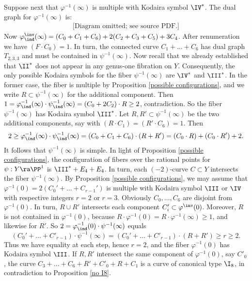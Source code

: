 Suppose next that $\varphi^{-1}(\infty)$ is multiple with Kodaira symbol $\IV^*$.
The dual graph for $\varphi^{-1}(\infty)$ is:
\begin{equation*}
\begin{gathered}
\text{[Diagram omitted; see source PDF.]}
\end{gathered}
\end{equation*}
Now $\varphi^\inv_\ind(\infty)=(C_0+C_1+C_6)+2(C_2+C_3+C_5)+ 3C_4$.
After renumeration  we have $(F\cdot C_0)=1$. In turn, the connected curve $C_1+\ldots+C_6$ has dual graph $T_{2,3,3}$
and must be contained in $\psi^{-1}(\infty)$.
Now recall that we already established that $\II^*$ does not appear in any genus-one fibration on $Y$.
Consequently, the only possible Kodaira symbols for
the fiber $\psi^{-1}(\infty)$ are $\IV^*$ and $\III^*$.
In the former case, the fiber is multiple  by Proposition \ref{possible configurations},
and we write  $R\subset\psi^{-1}(\infty)$ for the additional component.
Then $1=\varphi^{-1}_\ind(\infty)\cdot\psi^{-1}_\ind(\infty) = (C_0+2C_2)\cdot R\geq 2$, contradiction.
So the fiber $\psi^{-1}(\infty)$ has Kodaira symbol $\III^*$.
Let $R,R'\subset\psi^{-1}(\infty)$ be the two additional components, say with
$(R\cdot C_1)=(R'\cdot C_6)=1$. Then
$$
2\geq \varphi^{-1}_\ind(\infty)\cdot\psi^{-1}_\ind(\infty)  = (C_0+C_1+C_6)\cdot (R+R')= (C_0\cdot R) + (C_0\cdot R')+2.
$$
It follows that $\psi^{-1}(\infty)$ is simple. In light of Proposition \ref{possible configurations},
the configuration of fibers over the rational points  for $\psi:Y\ra\PP^1$
is $\III^*+E_4+E_4$. In turn, each $(-2)$-curve $C\subset Y$ intersects the fiber $\psi^{-1}(\infty)$.
By Proposition \ref{possible configurations},
we may assume that $\varphi^{-1}(0)=2(C_0'+\ldots+C_{r-1}')$ is multiple with  Kodaira symbol $\III$ or $\IV$
with respective integers $r=2$ or $r=3$.
Obviously  $C_0,\ldots,C_6$ are disjoint from  $\varphi^{-1}(0)$.
In turn, $R\cup R'$ intersects each component $C'_i\subset\varphi^\inv(0)$.
Moreover, $R$ is not contained in $\varphi^{-1}(0)$, because
$R\cdot\varphi^{-1}(0) = R\cdot \varphi^{-1}(\infty)\geq 1$, and likewise for $R'$.
So $2=\varphi^{-1}_\ind(0) \cdot \psi^{-1}(\infty) $ equals
$$
(C_0'+\ldots+C'_{r-1})\cdot \psi^{-1}(\infty) = (C_0'+\ldots+C'_{r-1})\cdot(R+R') \geq r\geq 2.
$$
Thus we have equality at each step, hence $r=2$, and the fiber $\varphi^{-1}(0)$ has Kodaira symbol $\III$.
If $R,R'$ intersect the same component of $\varphi^{-1}(0)$, say $C'_0$, the curve $C_3+\ldots+C_6+R'+C'_0+R+ C_1$ is
a curve of canonical type $\I_8$, in contradiction to Proposition \ref{no I8}.
